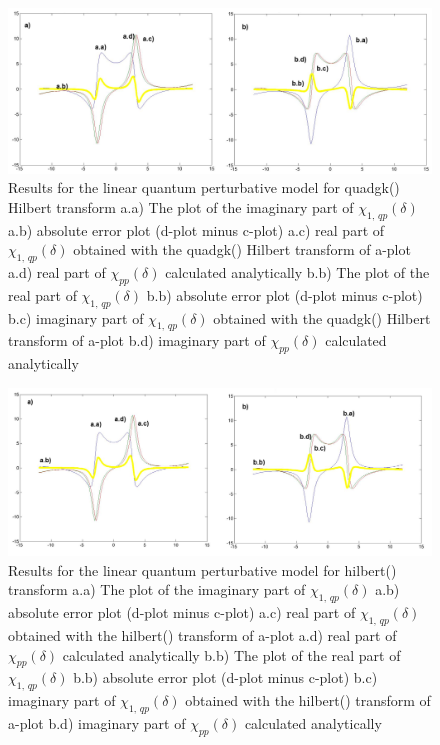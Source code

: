 \documentclass[12pt,twoside,a4paper]{article}
\numberwithin{equation}{subsection}
\numberwithin{figure}{subsection}
\begin{document}
\begin{figure}
  \includegraphics[width=150mm]{img/quadgk_qp1.png}
  \caption{Results for the linear quantum perturbative model for quadgk() Hilbert transform
    a.a) The plot of the imaginary part of ${\chi_{1, \,qp}}(\delta )$
    a.b) absolute error plot (d-plot minus c-plot) 
    a.c) real part of ${\chi_{1, \,qp}}(\delta )$ obtained with the quadgk() Hilbert transform of a-plot 
    a.d) real part of ${\chi_{pp}}(\delta )$ calculated analytically 
    b.b) The plot of the real part of ${\chi_{1, \,qp}}(\delta )$ 
    b.b) absolute error plot (d-plot minus c-plot) 
    b.c) imaginary part of ${\chi_{1, \,qp}}(\delta )$ obtained with the quadgk()  Hilbert transform of a-plot 
    b.d) imaginary part of ${\chi_{pp}}(\delta )$ calculated analytically  
    \label{fig:quadgk_qp1}
  }
\end{figure}

\begin{figure}
  \includegraphics[width=150mm]{img/hilb_qp1.png}
  \caption{Results for the linear quantum perturbative model for hilbert() transform
    a.a) The plot of the imaginary part of ${\chi_{1, \,qp}}(\delta )$
    a.b) absolute error plot (d-plot minus c-plot) 
    a.c) real part of ${\chi_{1, \,qp}}(\delta )$ obtained with the hilbert()  transform of a-plot 
    a.d) real part of ${\chi_{pp}}(\delta )$ calculated analytically 
    b.b) The plot of the real part of ${\chi_{1, \,qp}}(\delta )$ 
    b.b) absolute error plot (d-plot minus c-plot) 
    b.c) imaginary part of ${\chi_{1, \,qp}}(\delta )$ obtained with the hilbert()  transform of a-plot 
    b.d) imaginary part of ${\chi_{pp}}(\delta )$ calculated analytically  
    \label{fig:hilb_qp1}
  }
\end{figure}
\end{document}
